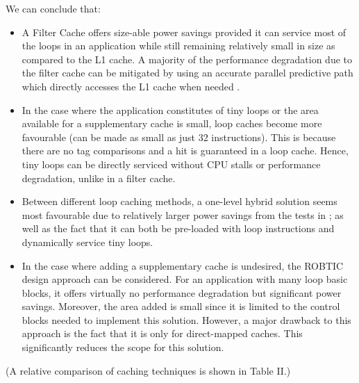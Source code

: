 \documentclass[conference]{IEEEtran}
\begin{document}
We can conclude that:
\begin{itemize}
    \item A Filter Cache offers size-able power savings provided it can service most of the loops in an application while still remaining relatively small in size as compared to the L1 cache. A majority of the performance degradation due to the filter cache can be mitigated by using an accurate parallel predictive path which directly accesses the L1 cache when needed \cite{fc3}.
    \item In the case where the application constitutes of tiny loops or the area available for a supplementary cache is small, loop caches become more favourable (can be made as small as just 32 instructions\cite{1}). This is because there are no tag comparisons and a hit is guaranteed in a loop cache. Hence, tiny loops can be directly serviced without CPU stalls or performance degradation, unlike in a filter cache.
    \item Between different loop caching methods, a one-level hybrid solution seems most favourable due to relatively larger power savings from the tests in \cite{1}; as well as the fact that it can both be pre-loaded with loop instructions and dynamically service tiny loops.
    \item In the case where adding a supplementary cache is undesired, the ROBTIC design approach can be considered. For an application with many loop basic blocks, it offers virtually no performance degradation but significant power savings. Moreover, the area added is small since it is limited to the control blocks needed to implement this solution. However, a major drawback to this approach is the fact that it is only for direct-mapped caches. This significantly reduces the scope for this solution. %
\end{itemize}
(A relative comparison of caching techniques is shown in Table II.)
\end{document}
